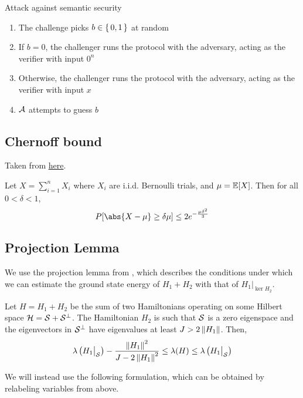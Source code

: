 \begin{protocol}{Attack against semantic security}
	\label{proto:indcpa}
	\begin{enumerate}
		\item The challenge picks $b\in\set{0,1}$ at random
		\item If $b=0$, the challenger runs the protocol with the adversary, acting as the verifier with input $0^n$
		\item Otherwise, the challenger runs the protocol with the adversary, acting as the verifier with input $x$
		\item $\mathcal{A}$ attempts to guess $b$
	\end{enumerate}
\end{protocol}

\subsection{Chernoff bound}

Taken from \href{http://math.mit.edu/~goemans/18310S15/chernoff-notes.pdf}{here}.

\begin{theorem}
\label{thm:Chernoff}
Let $X=\sum_{i=1}^n X_i$ where $X_i$ are i.i.d. Bernoulli trials, and $\mu=\operatorname*{\mathbb{E}}[X]$.
Then for all $0<\delta<1$,
$$P[\abs{X-\mu}\geq\delta\mu]\leq2e^{-\frac{\mu\delta^2}{3}}$$
\end{theorem}

\subsection{Projection Lemma}

We use the projection lemma from \cite{kempe_kitaev_regev_2006}, which describes the conditions under which we can estimate the ground state energy of $H_1 + H_2$ with that of $H_1\big|_{\ker H_2}$.

\begin{thm}
	Let $H=H_1+H_2$ be the sum of two Hamiltonians operating on some Hilbert space $\mathcal{H}=\mathcal{S}+\mathcal{S}^\bot$.
	The Hamiltonian $H_2$ is such that $\mathcal{S}$ is a zero eigenspace and the eigenvectors in $\mathcal{S}^\bot$ have eigenvalues at least $J>2\left\lVert H_1\right\rVert$. Then,
	$$\lambda\left(H_1\big|_{\mathcal{S}}\right)-\frac{\left\lVert H_1\right\rVert^2}{J-2\left\lVert H_1\right\rVert^2}\leq\lambda(H)\leq\lambda\left(H_1\big|_{\mathcal{S}}\right)$$
\end{thm}

We will instead use the following formulation, which can be obtained by relabeling variables from above.

